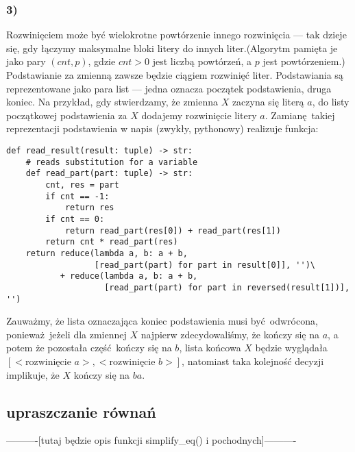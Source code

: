 \documentclass[leqno, 12pt]{article}
\begin{document}
\subsubsection*{3)}
Rozwinięciem może być wielokrotne powtórzenie innego rozwinięcia --- tak dzieje się, gdy łączymy maksymalne bloki litery do innych liter.\newline (Algorytm pamięta je jako pary $(cnt, p)$, gdzie $cnt > 0$ jest liczbą powtórzeń, a $p$ jest powtórzeniem.)
\newline\newline\newline
Podstawianie za zmienną zawsze będzie ciągiem rozwinięć liter. Podstawiania są reprezentowane jako para list --- jedna oznacza początek podstawienia, druga koniec. Na przykład, gdy stwierdzamy, że zmienna $X$ zaczyna się literą $a$, do listy początkowej podstawienia za $X$ dodajemy rozwinięcie litery $a$.
\newline\newline
Zamianę takiej reprezentacji podstawienia w napis (zwykły, pythonowy) realizuje funkcja:
\begin{verbatim}
def read_result(result: tuple) -> str:
    # reads substitution for a variable
    def read_part(part: tuple) -> str:
        cnt, res = part
        if cnt == -1:
            return res
        if cnt == 0:
            return read_part(res[0]) + read_part(res[1])
        return cnt * read_part(res)
    return reduce(lambda a, b: a + b,
                  [read_part(part) for part in result[0]], '')\
           + reduce(lambda a, b: a + b,
                    [read_part(part) for part in reversed(result[1])], '')
\end{verbatim}
Zauważmy, że lista oznaczająca koniec podstawienia musi być odwrócona, ponieważ jeżeli dla zmiennej $X$ najpierw zdecydowaliśmy, że kończy się na $a$, a potem że pozostała część kończy się na $b$, lista końcowa $X$ będzie wyglądała \newline$[<\text{rozwinięcie }a>, <\text{rozwinięcie }b>]$, natomiast taka kolejność decyzji implikuje, że $X$ kończy się na $ba$.

\subsection{upraszczanie równań}
----------[tutaj będzie opis funkcji simplify\_eq() i pochodnych]----------
\end{document}
